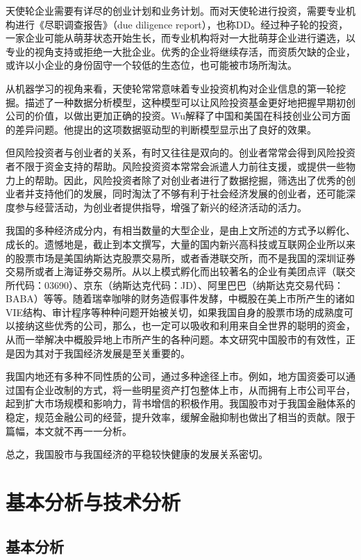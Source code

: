 \documentclass[twoside,longtitle]{LZUthesis}
\begin{document}
天使轮企业需要有详尽的创业计划和业务计划。而对天使轮进行投资，需要专业机构进行《尽职调查报告》（due diligence report），也称DD。经过种子轮的投资，一家企业可能从萌芽状态开始生长，而专业机构将对一大批萌芽企业进行遴选，以专业的视角支持或拒绝一大批企业。优秀的企业将继续存活，而资质欠缺的企业，或许以小企业的身份固守一个较低的生态位，也可能被市场所淘汰。

从机器学习的视角来看，天使轮常常意味着专业投资机构对企业信息的第一轮挖掘。描述了一种数据分析模型，这种模型可以让风险投资基金更好地把握早期初创公司的价值，以做出更加正确的投资。Wu解释了中国和美国在科技创业公司方面的差异问题。他提出的这项数据驱动型的判断模型显示出了良好的效果。

但风险投资者与创业者的关系，有时又往往是双向的。创业者常常会得到风险投资者不限于资金支持的帮助。风险投资资本常常会派遣人力前往支援，或提供一些物力上的帮助。因此，风险投资者除了对创业者进行了数据挖掘，筛选出了优秀的创业者并支持他们的发展，同时淘汰了不够有利于社会经济发展的创业者，还可能深度参与经营活动，为创业者提供指导，增强了新兴的经济活动的活力。

我国的多种经济成分内，有相当数量的大型企业，是由上文所述的方式予以孵化、成长的。遗憾地是，截止到本文撰写，大量的国内新兴高科技或互联网企业所以来的股票市场是美国纳斯达克股票交易所，或者香港联交所，而不是我国的深圳证券交易所或者上海证券交易所。从以上模式孵化而出较著名的企业有美团点评（联交所代码：03690）、京东（纳斯达克代码：JD）、阿里巴巴（纳斯达克交易代码：BABA）等等。随着瑞幸咖啡的财务造假事件发酵，中概股在美上市所产生的诸如VIE结构、审计程序等种种问题开始被关切，如果我国自身的股票市场的成熟度可以接纳这些优秀的公司，那么，也一定可以吸收和利用来自全世界的聪明的资金，从而一举解决中概股异地上市所产生的各种问题。本文研究中国股市的有效性，正是因为其对于我国经济发展是至关重要的。

我国内地还有多种不同性质的公司，通过多种途径上市。例如，地方国资委可以通过国有企业改制的方式，将一些明星资产打包整体上市，从而拥有上市公司平台，起到扩大市场规模和影响力，背书增信的积极作用。我国股市对于我国金融体系的稳定，规范金融公司的经营，提升效率，缓解金融抑制也做出了相当的贡献。限于篇幅，本文就不再一一分析。

总之，我国股市与我国经济的平稳较快健康的发展关系密切。

\section{基本分析与技术分析}
\subsection{基本分析}
\end{document}
